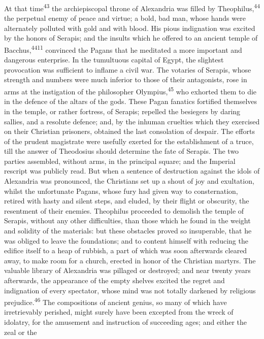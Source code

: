 At that time\textsuperscript{43} the archiepiscopal throne of Alexandria was
filled by Theophilus,\textsuperscript{44} the perpetual enemy of peace and virtue;
a bold, bad man, whose hands were alternately polluted with gold
and with blood. His pious indignation was excited by the honors
of Serapis; and the insults which he offered to an ancient temple
of Bacchus,\textsuperscript{4411} convinced the Pagans that he meditated a more
important and dangerous enterprise. In the tumultuous capital of
Egypt, the slightest provocation was sufficient to inflame a
civil war. The votaries of Serapis, whose strength and numbers
were much inferior to those of their antagonists, rose in arms at
the instigation of the philosopher Olympius,\textsuperscript{45} who exhorted them
to die in the defence of the altars of the gods. These Pagan
fanatics fortified themselves in the temple, or rather fortress,
of Serapis; repelled the besiegers by daring sallies, and a
resolute defence; and, by the inhuman cruelties which they
exercised on their Christian prisoners, obtained the last
consolation of despair. The efforts of the prudent magistrate
were usefully exerted for the establishment of a truce, till the
answer of Theodosius should determine the fate of Serapis. The
two parties assembled, without arms, in the principal square; and
the Imperial rescript was publicly read. But when a sentence of
destruction against the idols of Alexandria was pronounced, the
Christians set up a shout of joy and exultation, whilst the
unfortunate Pagans, whose fury had given way to consternation,
retired with hasty and silent steps, and eluded, by their flight
or obscurity, the resentment of their enemies. Theophilus
proceeded to demolish the temple of Serapis, without any other
difficulties, than those which he found in the weight and
solidity of the materials: but these obstacles proved so
insuperable, that he was obliged to leave the foundations; and to
content himself with reducing the edifice itself to a heap of
rubbish, a part of which was soon afterwards cleared away, to
make room for a church, erected in honor of the Christian
martyrs. The valuable library of Alexandria was pillaged or
destroyed; and near twenty years afterwards, the appearance of
the empty shelves excited the regret and indignation of every
spectator, whose mind was not totally darkened by religious
prejudice.\textsuperscript{46} The compositions of ancient genius, so many of
which have irretrievably perished, might surely have been
excepted from the wreck of idolatry, for the amusement and
instruction of succeeding ages; and either the zeal or the
